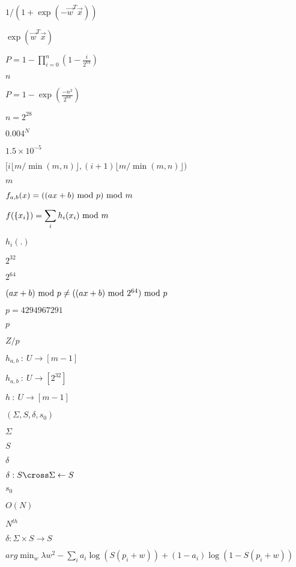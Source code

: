\documentclass{article}
\begin{document}
$1/(1 + \exp(-\vec{w}^T \vec{x}))$
\pagebreak

$\exp(\vec{w}^T \vec{x})$
\pagebreak

$\displaystyle P = 1 - \prod_{i=0}^{n}{\left(1 - \frac{i}{2^{64}}\right)}$
\pagebreak

$n$
\pagebreak

$\displaystyle P = 1 - \exp(\frac{-n^2}{2^{64}})$
\pagebreak

$n = 2^{28}$
\pagebreak

$0.004^N$
\pagebreak

$1.5 \times 10^{-5}$
\pagebreak

$[ i \lfloor m / \min(m,n) \rfloor, (i+1) \lfloor m / \min(m,n) \rfloor)$
\pagebreak

$m$
\pagebreak

$\displaystyle f_{a,b}(x) = ((ax + b)\ \textup{mod}\ p)\ \textup{mod}\ m$
\pagebreak

$\displaystyle f(\{x_i\}) = \sum_i{h_i(x_i)}\ \textup{mod}\ m$
\pagebreak

$h_i(.)$
\pagebreak

$2^{32}$
\pagebreak

$2^{64}$
\pagebreak

$(ax + b)\textup{ mod }p \neq ((ax + b)\textup{ mod }2^{64})\textup{ mod }p$
\pagebreak

$p = 4294967291$
\pagebreak

$p$
\pagebreak

$Z/p$
\pagebreak

$\displaystyle h_{a,b}\ :\ U \rightarrow [m-1]$
\pagebreak

$\displaystyle h_{a,b}\ :\ U \rightarrow [2^{32}]$
\pagebreak

$\displaystyle h\ :\ U \rightarrow [m-1]$
\pagebreak

$\left(\Sigma, S, \delta, s_0\right)$
\pagebreak

$\Sigma$
\pagebreak

$S$
\pagebreak

$\delta$
\pagebreak

$\delta : S \cross \Sigma \leftarrow S$
\pagebreak

$s_0$
\pagebreak

$O(N)$
\pagebreak

$N^{th}$
\pagebreak

$\delta : \Sigma \times S \rightarrow S$
\pagebreak

$\displaystyle arg\min_w{ \lambda w^2 -\sum_i{ a_i \log(S(p_i + w)) + (1 - a_i) \log(1 - S(p_i + w)) } }$
\pagebreak
\end{document}

